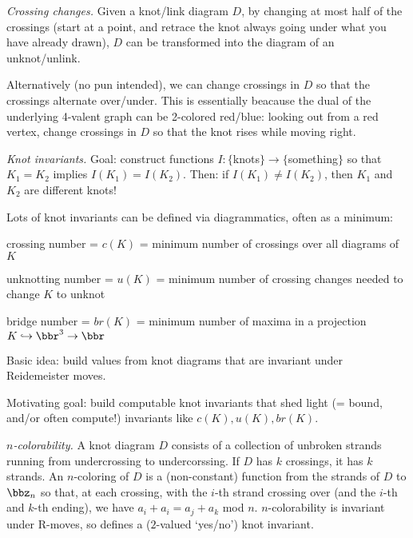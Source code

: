 \msk

{\it Crossing changes.} Given a knot/link diagram $D$, by changing at most half of the crossings
(start at a point, and retrace the knot always going under what you have already drawn),
$D$ can be transformed into the diagram of an unknot/unlink.

\ssk

Alternatively (no pun intended), we can change crossings in $D$ so that the crossings
alternate over/under. This is essentially beacause the dual of the underlying 4-valent
graph can be 2-colored red/blue: looking out from a red vertex, change crossings in $D$ so that
the knot rises while moving right. 

\msk

{\it Knot invariants.} Goal: construct functions $I:\{$knots$\}\rightarrow\{$something$\}$ so that 
$K_1=K_2$ implies $I(K_1)=I(K_2)$. Then: if $I(K_1)\neq I(K_2)$, then $K_1$ and $K_2$ are 
different knots!

\ssk

Lots of knot invariants can be defined via diagrammatics, often as a minimum:

crossing number = $c(K)$ = minimum number of crossings over all diagrams of $K$

unknotting number = $u(K)$ = minimum number of crossing changes needed to change $K$ to unknot

bridge number = $br(K)$ = minimum number of maxima in a projection $K\hookrightarrow \bbr^3 \rightarrow \bbr$

\ssk

Basic idea: build values from knot diagrams that are invariant under Reidemeister moves.

\ssk

Motivating goal: build computable knot invariants that shed light (= bound, and/or often compute!) invariants
like $c(K),u(K),br(K)$.

\ssk

{\it $n$-colorability.} A knot diagram $D$ consists of a collection of unbroken strands running
from undercrossing to undercorssing. If $D$ has $k$ crossings, it has $k$ strands. An $n$-coloring
of $D$ is a (non-constant) function from the strands of $D$ to $\bbz_n$ so that, at each crossing, with
the $i$-th strand crossing over (and the $i$-th and $k$-th ending), we have $a_i+a_i=a_j+a_k$ mod $n$.
$n$-colorability is invariant under R-moves, so defines a ($2$-valued `yes/no') knot invariant.

\ssk

